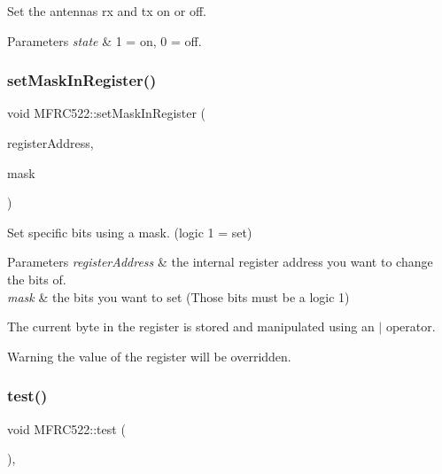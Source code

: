 Set the antennas rx and tx on or off. 


\begin{DoxyParams}{Parameters}
{\em state} & 1 = on, 0 = off. \\
\hline
\end{DoxyParams}
\mbox{\label{class_m_f_r_c522_ae30686cdd50f6fdb821908a2547e5153}} 
\subsubsection{\texorpdfstring{set\+Mask\+In\+Register()}{setMaskInRegister()}}
{\footnotesize\ttfamily void M\+F\+R\+C522\+::set\+Mask\+In\+Register (\begin{DoxyParamCaption}\item[{\mbox{\hyperlink{class_m_f_r_c522_ae7ec09eb8c9c61288a4770175b4b8db7}{R\+EG}}}]{register\+Address,  }\item[{uint8\+\_\+t}]{mask }\end{DoxyParamCaption})\hspace{0.3cm}{\ttfamily [protected]}}



Set specific bits using a mask. (logic 1 = set) 


\begin{DoxyParams}{Parameters}
{\em register\+Address} & the internal register address you want to change the bits of. \\
\hline
{\em mask} & the bits you want to set (Those bits must be a logic 1)\\
\hline
\end{DoxyParams}
The current byte in the register is stored and manipulated using an $\vert$ operator. \begin{DoxyWarning}{Warning}
the value of the register will be overridden. 
\end{DoxyWarning}
\mbox{\label{class_m_f_r_c522_aff8e84921e9f133cfbd243ce994da023}} 
\subsubsection{\texorpdfstring{test()}{test()}}
{\footnotesize\ttfamily void M\+F\+R\+C522\+::test (\begin{DoxyParamCaption}{ }\end{DoxyParamCaption})\hspace{0.3cm}{\ttfamily [override]}, {\ttfamily [virtual]}}



